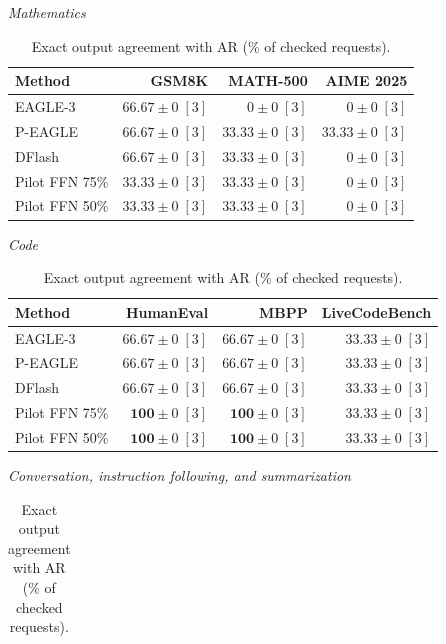 \begin{table}[!htp]
\centering\small
\setlength{\tabcolsep}{3pt}
\caption{Exact output agreement with AR (\% of checked requests).}
\label{tab:appendix-metric-quality-none}
\textit{Mathematics}\par\smallskip
\begin{tabular}{@{}>{\raggedright\arraybackslash}p{3.7cm}rrr@{}}
\toprule
Method & GSM8K & MATH-500 & AIME 2025 \\
\midrule
EAGLE-3 & \(\mathbf{66.67} \pm 0\;[3]\) & \(0 \pm 0\;[3]\) & \(0 \pm 0\;[3]\) \\
P-EAGLE & \(\mathbf{66.67} \pm 0\;[3]\) & \(\mathbf{33.33} \pm 0\;[3]\) & \(\mathbf{33.33} \pm 0\;[3]\) \\
DFlash & \(\mathbf{66.67} \pm 0\;[3]\) & \(\mathbf{33.33} \pm 0\;[3]\) & \(0 \pm 0\;[3]\) \\
Pilot FFN 75\% & \(33.33 \pm 0\;[3]\) & \(\mathbf{33.33} \pm 0\;[3]\) & \(0 \pm 0\;[3]\) \\
Pilot FFN 50\% & \(33.33 \pm 0\;[3]\) & \(\mathbf{33.33} \pm 0\;[3]\) & \(0 \pm 0\;[3]\) \\
\bottomrule
\end{tabular}\par\medskip
\textit{Code}\par\smallskip
\begin{tabular}{@{}>{\raggedright\arraybackslash}p{3.7cm}rrr@{}}
\toprule
Method & HumanEval & MBPP & LiveCodeBench \\
\midrule
EAGLE-3 & \(66.67 \pm 0\;[3]\) & \(66.67 \pm 0\;[3]\) & \(\mathbf{33.33} \pm 0\;[3]\) \\
P-EAGLE & \(66.67 \pm 0\;[3]\) & \(66.67 \pm 0\;[3]\) & \(\mathbf{33.33} \pm 0\;[3]\) \\
DFlash & \(66.67 \pm 0\;[3]\) & \(66.67 \pm 0\;[3]\) & \(\mathbf{33.33} \pm 0\;[3]\) \\
Pilot FFN 75\% & \(\mathbf{100} \pm 0\;[3]\) & \(\mathbf{100} \pm 0\;[3]\) & \(\mathbf{33.33} \pm 0\;[3]\) \\
Pilot FFN 50\% & \(\mathbf{100} \pm 0\;[3]\) & \(\mathbf{100} \pm 0\;[3]\) & \(\mathbf{33.33} \pm 0\;[3]\) \\
\bottomrule
\end{tabular}\par\medskip
\textit{Conversation, instruction following, and summarization}\par\smallskip
\begin{tabular}{@{}>{\raggedright\arraybackslash}p{3.7cm}rrrr@{}}

\end{tabular}
\end{table}
